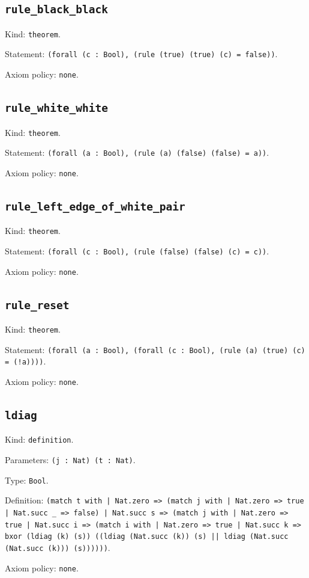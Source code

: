 \documentclass[11pt]{article}
\begin{document}
\subsection*{\texttt{rule\_black\_black}}
\noindent Kind: \texttt{theorem}.\par
\noindent Statement: \texttt{(forall (c : Bool), (rule (true) (true) (c) = false))}.\par
\noindent Axiom policy: \texttt{none}.\par
\subsection*{\texttt{rule\_white\_white}}
\noindent Kind: \texttt{theorem}.\par
\noindent Statement: \texttt{(forall (a : Bool), (rule (a) (false) (false) = a))}.\par
\noindent Axiom policy: \texttt{none}.\par
\subsection*{\texttt{rule\_left\_edge\_of\_white\_pair}}
\noindent Kind: \texttt{theorem}.\par
\noindent Statement: \texttt{(forall (c : Bool), (rule (false) (false) (c) = c))}.\par
\noindent Axiom policy: \texttt{none}.\par
\subsection*{\texttt{rule\_reset}}
\noindent Kind: \texttt{theorem}.\par
\noindent Statement: \texttt{(forall (a : Bool), (forall (c : Bool), (rule (a) (true) (c) = (!a))))}.\par
\noindent Axiom policy: \texttt{none}.\par
\subsection*{\texttt{ldiag}}
\noindent Kind: \texttt{definition}.\par
\noindent Parameters: \texttt{(j : Nat) (t : Nat)}.\par
\noindent Type: \texttt{Bool}.\par
\noindent Definition: \texttt{(match t with | Nat.zero => (match j with | Nat.zero => true | Nat.succ \_ => false) | Nat.succ s => (match j with | Nat.zero => true | Nat.succ i => (match i with | Nat.zero => true | Nat.succ k => bxor (ldiag (k) (s)) ((ldiag (Nat.succ (k)) (s) || ldiag (Nat.succ (Nat.succ (k))) (s))))))}.\par
\noindent Axiom policy: \texttt{none}.\par
\end{document}
